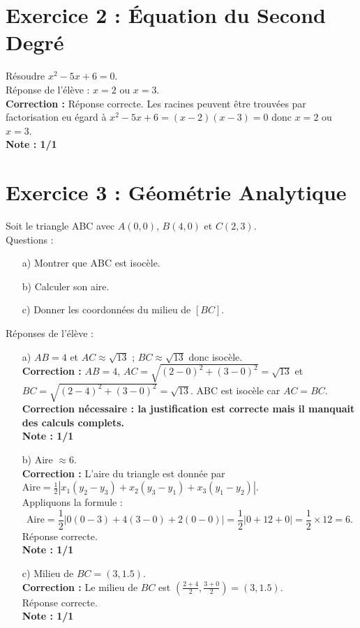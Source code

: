 \documentclass{article}
\begin{document}
\section*{Exercice 2 : Équation du Second Degré}
Résoudre $x^2 - 5x + 6 = 0$. \\ 
Réponse de l’élève : 
$x = 2$ ou $x = 3$. \\
\textbf{Correction :} Réponse correcte. Les racines peuvent être trouvées par factorisation eu égard à $x^2 - 5x + 6 = (x - 2)(x - 3) = 0$ donc $x = 2$ ou $x = 3$. \\
\textbf{Note : 1/1}

\section*{Exercice 3 : Géométrie Analytique}
Soit le triangle ABC avec $A(0,0)$, $B(4,0)$ et $C(2,3)$. \\
Questions :
\begin{enumerate}
    \item[a)] Montrer que ABC est isocèle.
    \item[b)] Calculer son aire.
    \item[c)] Donner les coordonnées du milieu de $[BC]$.
\end{enumerate}
Réponses de l’élève :
\begin{enumerate}
    \item[a)] $AB = 4$ et $AC \approx \sqrt{13}$ ; $BC \approx \sqrt{13}$ donc isocèle. \\
    \textbf{Correction :} $AB = 4$, $AC = \sqrt{(2-0)^2 + (3-0)^2} = \sqrt{13}$ et $BC = \sqrt{(2-4)^2 + (3-0)^2} = \sqrt{13}$. ABC est isocèle car $AC = BC$. \\
    \textbf{Correction nécessaire : la justification est correcte mais il manquait des calculs complets.}\\
    \textbf{Note : 1/1}
    
    \item[b)] Aire $\approx 6$. \\
    \textbf{Correction :} L'aire du triangle est donnée par $\text{Aire} = \frac{1}{2} \left| x_1(y_2-y_3) + x_2(y_3-y_1) + x_3(y_1-y_2) \right|$.\\
    Appliquons la formule :
    \[
    \text{Aire} = \frac{1}{2} \left| 0(0-3) + 4(3-0) + 2(0-0) \right| = \frac{1}{2} \left| 0 + 12 + 0 \right| = \frac{1}{2} \times 12 = 6.
    \]
    Réponse correcte. \\
    \textbf{Note : 1/1}
    
    \item[c)] Milieu de $BC = (3, 1.5)$. \\
    \textbf{Correction :} Le milieu de $BC$ est $\left(\frac{2+4}{2}, \frac{3+0}{2}\right) = (3, 1.5)$.\\
    Réponse correcte. \\
    \textbf{Note : 1/1}
\end{enumerate}
\end{document}
